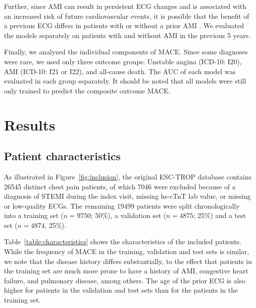 \documentclass[preprint]{elsarticle}
\begin{document}
Further, since AMI can result in persistent ECG changes and is associated with an increased risk of future cardiovascular events, it is possible that the benefit of a previous ECG differs in patients with or without a prior AMI \citep{strom2007,sawai2017}. We evaluated the models separately on patients with and without AMI in the previous 5 years.

Finally, we analyzed the individual components of MACE. Since some diagnoses were rare, we used only three outcome groups: Unstable angina (ICD-10: I20), AMI (ICD-10: I21 or I22), and all-cause death. The AUC of each model was evaluated in each group separately. It should be noted that all models were still only trained to predict the composite outcome MACE.

\section{Results}
\subsection{Patient characteristics}
\label{sec:patient_characteristics}
As illustrated in Figure~\ref{fig:inclusion}, the original ESC-TROP database contains 26545 distinct chest pain patients, of which 7046 were excluded because of a diagnosis of STEMI during the index visit, missing hs-cTnT lab value, or missing or low-quality ECGs. The remaining 19499 patients were split chronologically into a training set ($n=9750$; 50\%), a validation set ($n=4875$; 25\%) and a test set ($n=4874$, 25\%).

Table~\ref{table:characteristics} shows the characteristics of the included patients. While the frequency of MACE in the training, validation and test sets is similar, we note that the disease history differs substantially, to the effect that patients in the training set are much more prone to have a history of AMI, congestive heart failure, and pulmonary disease, among others. The age of the prior ECG is also higher for patients in the validation and test sets than for the patients in the training set.
\end{document}
